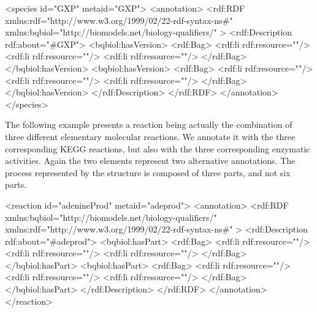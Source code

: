 \begin{example}
<species id="GXP" metaid="GXP">
  <annotation>
    <rdf:RDF
      xmlns:rdf="http://www.w3.org/1999/02/22-rdf-syntax-ns\#"
      xmlns:bqbiol="http://biomodels.net/biology-qualifiers/"
    >
      <rdf:Description rdf:about="\#GXP">
        <bqbiol:hasVersion>
          <rdf:Bag>
            <rdf:li rdf:resource="\!"/>
            <rdf:li rdf:resource="\!"/>
            <rdf:li rdf:resource="\!"/>
          </rdf:Bag>
        </bqbiol:hasVersion>
        <bqbiol:hasVersion>
          <rdf:Bag>
            <rdf:li rdf:resource="\!"/>
            <rdf:li rdf:resource="\!"/>
            <rdf:li rdf:resource="\!"/>
          </rdf:Bag>
        </bqbiol:hasVersion>
      </rdf:Description>
    </rdf:RDF>
  </annotation>
</species>
\end{example}

The following example presents a reaction being actually the
combination of three different elementary molecular reactions. We
annotate it with the three corresponding KEGG reactions, but also
with the three corresponding enzymatic activities.  Again the two
 elements represent two alternative annotations.
The process represented by the \Reaction structure is
composed of three parts, and  not six parts.

\begin{example}
<reaction id="adenineProd" metaid="adeprod">
  <annotation>
    <rdf:RDF
      xmlns:bqbiol="http://biomodels.net/biology-qualifiers/"
      xmlns:rdf="http://www.w3.org/1999/02/22-rdf-syntax-ns\#"
    >
      <rdf:Description rdf:about="\#adeprod">
        <bqbiol:hasPart>
          <rdf:Bag>
            <rdf:li rdf:resource="\!"/>
            <rdf:li rdf:resource="\!"/>
            <rdf:li rdf:resource="\!"/>
          </rdf:Bag>
        </bqbiol:hasPart>
        <bqbiol:hasPart>
          <rdf:Bag>
            <rdf:li rdf:resource="\!"/>
            <rdf:li rdf:resource="\!"/>
            <rdf:li rdf:resource="\!"/>
          </rdf:Bag>
        </bqbiol:hasPart>
      </rdf:Description>
    </rdf:RDF>
  </annotation>
</reaction>
\end{example}

